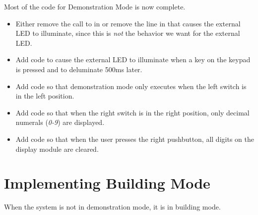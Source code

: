 Most of the code for Demonstration Mode is now complete.

    \begin{itemize}
    \item Either remove the call to  in
         or remove the line in  that
        causes the external LED to illuminate, since this is \textit{not} the
        behavior we want for the external LED.
    \item Add code to cause the external LED to illuminate when a key on the
        keypad is pressed and to deluminate 500ms later.
    \item Add code so that demonstration mode only executes when the left
        switch is in the left position.
    \item Add code so that when the right switch is in the right position, only
        decimal numerals (\textit{0-9}) are displayed.
    \item Add code so that when the user presses the right pushbutton, all
        digits on the display module are cleared.
    \end{itemize}

\section{Implementing Building Mode} \label{sec:BuildingMode}

When the system is not in demonstration mode, it is in building mode.

